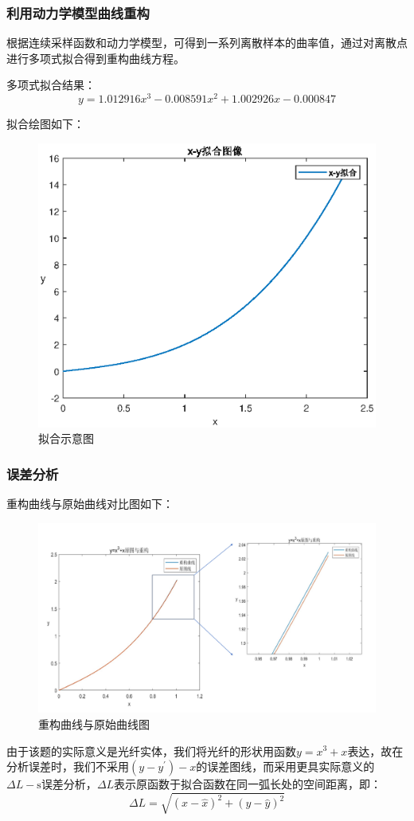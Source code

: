 \documentclass[withoutpreface,bwprint]{cumcmthesis}
\begin{document}
\subsubsection{利用动力学模型曲线重构}
根据连续采样函数和动力学模型，可得到一系列离散样本的曲率值，通过对离散点进行多项式拟合得到重构曲线方程。

多项式拟合结果：
\begin{equation}
y=1.012916x^3-0.008591x^2+1.002926x-0.000847
\end{equation}

拟合绘图如下：
\begin{figure}[!h]
\centering
\includegraphics[width=.6\textwidth]{x-y拟合.eps}
\caption{拟合示意图}
\end{figure}


\subsubsection{误差分析}
重构曲线与原始曲线对比图如下：
\begin{figure}[!h]
\centering
\includegraphics[width=.8\textwidth]{Q3_11.pdf}
\caption{重构曲线与原始曲线图}
\end{figure}


由于该题的实际意义是光纤实体，我们将光纤的形状用函数$y=x^3+x$表达，故在分析误差时，我们不采用$
\left(y-y^{\prime}\right)-x $的误差图线，而采用更具实际意义的$\Delta L-\mathrm{s}$误差分析，$\Delta L$表示原函数于拟合函数在同一弧长处的空间距离，即：
\begin{equation}
\Delta L=\sqrt{(x-\hat{x})^2+(y-\hat{y})^2}
\end{equation}
\end{document}
